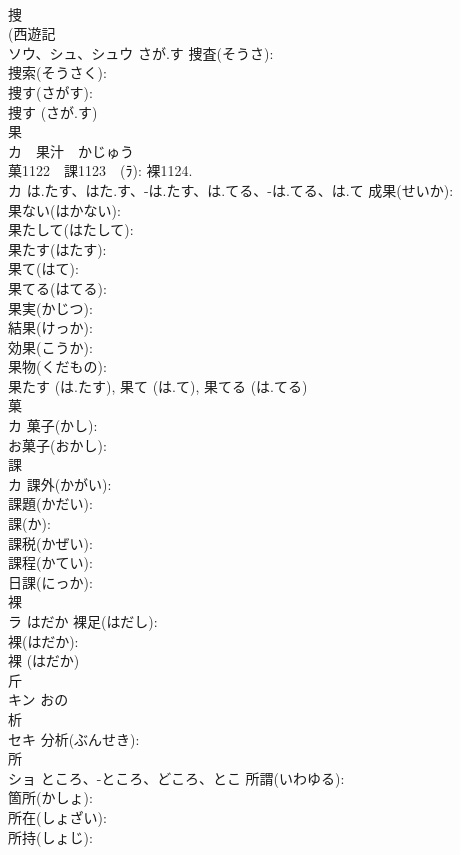 \documentclass[8pt]{extreport}
\begin{document}
\begin{CJK}{UTF8}{min}
\\	捜			
\\	(西遊記 
\\	ソウ、シュ、シュウ	さが.す	捜査(そうさ): 
\\	捜索(そうさく): 
\\	捜す(さがす): 
\\	捜す (さが.す)
\\	果			
\\	カ　果汁　かじゅう 
\\	菓1122　課1123　(ﾗ): 裸1124.	
\\	カ	は.たす、はた.す、-は.たす、は.てる、-は.てる、は.て	成果(せいか): 
\\	果ない(はかない): 
\\	果たして(はたして): 
\\	果たす(はたす): 
\\	果て(はて): 
\\	果てる(はてる): 
\\	果実(かじつ): 
\\	結果(けっか): 
\\	効果(こうか): 
\\	果物(くだもの): 
\\	果たす (は.たす), 果て (は.て), 果てる (は.てる)
\\	菓			
\\	カ		菓子(かし): 
\\	お菓子(おかし): 
\\	課			
\\	カ		課外(かがい): 
\\	課題(かだい): 
\\	課(か): 
\\	課税(かぜい): 
\\	課程(かてい): 
\\	日課(にっか): 
\\	裸			
\\	ラ	はだか	裸足(はだし): 
\\	裸(はだか): 
\\	裸 (はだか)
\\	斤			
\\	キン	おの		
\\	析			
\\	セキ		分析(ぶんせき): 
\\	所			
\\	ショ	ところ、-ところ、どころ、とこ	所謂(いわゆる): 
\\	箇所(かしょ): 
\\	所在(しょざい): 
\\	所持(しょじ): 

\end{CJK}
\end{document}
